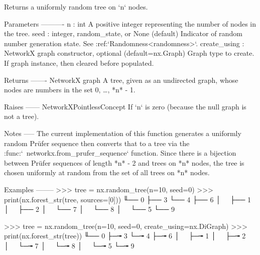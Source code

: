 \begin{DoxyVerb}Returns a uniformly random tree on `n` nodes.

Parameters
----------
n : int
    A positive integer representing the number of nodes in the tree.
seed : integer, random_state, or None (default)
    Indicator of random number generation state.
    See :ref:`Randomness<randomness>`.
create_using : NetworkX graph constructor, optional (default=nx.Graph)
    Graph type to create. If graph instance, then cleared before populated.

Returns
-------
NetworkX graph
    A tree, given as an undirected graph, whose nodes are numbers in
    the set {0, …, *n* - 1}.

Raises
------
NetworkXPointlessConcept
    If `n` is zero (because the null graph is not a tree).

Notes
-----
The current implementation of this function generates a uniformly
random Prüfer sequence then converts that to a tree via the
:func:`~networkx.from_prufer_sequence` function. Since there is a
bijection between Prüfer sequences of length *n* - 2 and trees on
*n* nodes, the tree is chosen uniformly at random from the set of
all trees on *n* nodes.

Examples
--------
>>> tree = nx.random_tree(n=10, seed=0)
>>> print(nx.forest_str(tree, sources=[0]))
╙── 0
    ├── 3
    └── 4
        ├── 6
        │   ├── 1
        │   ├── 2
        │   └── 7
        │       └── 8
        │           └── 5
        └── 9

>>> tree = nx.random_tree(n=10, seed=0, create_using=nx.DiGraph)
>>> print(nx.forest_str(tree))
╙── 0
    ├─╼ 3
    └─╼ 4
        ├─╼ 6
        │   ├─╼ 1
        │   ├─╼ 2
        │   └─╼ 7
        │       └─╼ 8
        │           └─╼ 5
        └─╼ 9
\end{DoxyVerb}
 